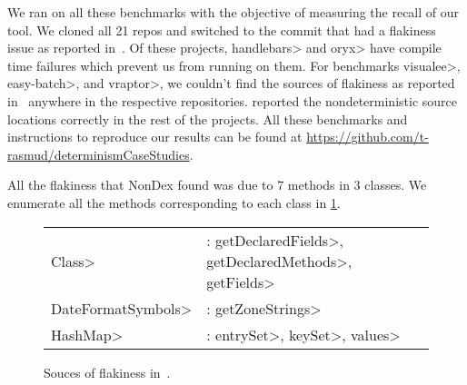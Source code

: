 We ran \TheDeterminismChecker on all these benchmarks with the objective
of measuring the recall of our tool. We cloned all 21 repos and switched to the commit that had a flakiness issue as reported 
in~\cite{nondex}. Of these projects, \<handlebars> and \<oryx> have compile time failures which prevent us from running \TheDeterminismChecker on them. For benchmarks \<visualee>, \<easy-batch>, and \<vraptor>, we couldn't find
the sources of flakiness as reported in~\cite{nondex} anywhere in the respective repositories.
\TheDeterminismChecker reported the nondeterministic source locations correctly in the rest of the projects.
All these benchmarks and instructions to reproduce our results can be found at \href{https://github.com/t-rasmud/determinismCaseStudies}{https://github.com/t-rasmud/determinismCaseStudies}.

All the flakiness that NonDex found was due to 7 methods in 3 classes. We enumerate all the methods corresponding to
each class in \cref{fig:flaky-sources}.
\begin{figure}
    \begin{tabular}{lll}
        \<Class> & : \<getDeclaredFields>, \<getDeclaredMethods>, \<getFields> \\
        \<DateFormatSymbols> & : \<getZoneStrings> \\
        \<HashMap> & : \<entrySet>, \<keySet>, \<values>
    \end{tabular}
\caption{Souces of flakiness in~\cite{nondex}.}
\label{fig:flaky-sources}
\end{figure}

